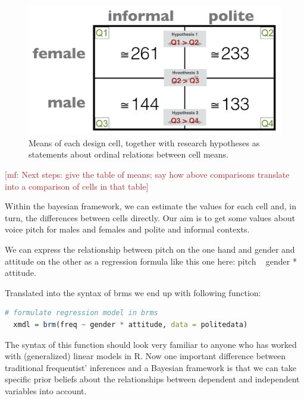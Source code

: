 \documentclass[nobib]{tufte-handout}
\renewcommand{\mf}[1]{\textcolor{firebrick}{[mf: #1]}}
\begin{document}
\begin{figure}[h]
  \centering
    \includegraphics[width = \textwidth]{pics/table_mean_hypotheses.png}
    \caption{Means of each design cell, together with research hypotheses as statements about ordinal relations between cell means.}
    \label{fig:BasicPlotData_table}
\end{figure}

\mf{Next steps: give the table of means; say how above comparisons translate into a comparison of cells in that table}

Within the bayesian framework, we can estimate the values for each cell and, in turn, the differences between cells directly. Our aim is to get some values about voice pitch for males and females and polite and informal contexts. 

We can express the relationship between pitch on the one hand and gender and attitude on the other as a regression formula like this one here: pitch ~ gender * attitude.

Translated into the syntax of brms we end up with following function:

\medskip

\begin{lstlisting}[language=R]
  # formulate regression model in brms
  xmdl = brm(freq ~ gender * attitude, data = politedata)
\end{lstlisting}

\vspace*{-0.5cm}

\noindent 

The syntax of this function should look very familiar to anyone who has worked with (generalized) linear models in R. Now one important difference between traditional frequentist' inferences and a Bayesian framework is that we can take specific prior beliefs about the relationships between dependent and independent variables into account. 
\end{document}
